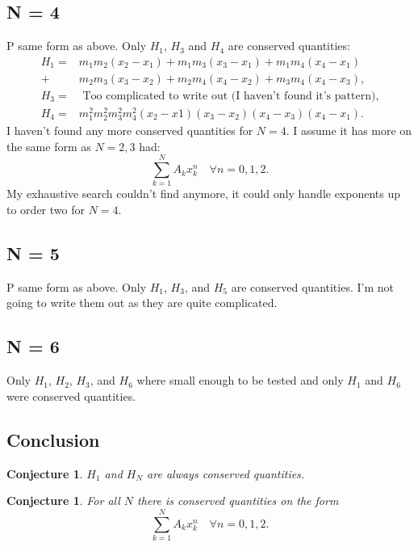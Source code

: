 \documentclass[english,master]{liumaiex}
\theoremstyle{plain}
\newtheorem{conjecture}[proposition]{Conjecture}
\theoremstyle{definition}
\begin{document}
\subsection{N = 4}

P same form as above. Only $H_1$, $H_3$ and $H_4$ are conserved quantities:
\begin{align}
	H_1 = &m_1 m_2 (x_2 - x_1) + m_1 m_3 (x_3 - x_1) + m_1 m_4 (x_4 - x_1) \\ +  &m_2 m_3 (x_3 - x_2) + m_2 m_4 (x_4 - x_2) + m_3 m_4 (x_4 - x_3), \\
	H_3 = &\text{ Too complicated to write out (I haven't found it's pattern)}, \\
	H_4 = &m_1^2m_2^2m_3^2m_4^2(x_2 - x1)(x_3 - x_2)(x_4 - x_3)(x_4 - x_1).
\end{align}
%
I haven't found any more conserved quantities for $N = 4$. I assume it has more on the same form as $N = 2, 3$ had:
\begin{equation}
	\sum_{k=1}^{N} A_k x_k^n \quad \forall n = 0, 1, 2.
\end{equation}
My exhaustive search couldn't find anymore, it could only handle exponents up to order two for $N = 4$.

\subsection{N = 5}

P same form as above. Only $H_1$, $H_3$, and $H_5$ are conserved quantities. I'm not going to write them out as they are quite complicated.

\subsection{N = 6}

Only $H_1$, $H_2$, $H_3$, and $H_6$ where small enough to be tested and only $H_1$ and $H_6$ were conserved quantities.

\subsection{Conclusion}

\begin{conjecture}
$H_1$ and $H_N$ are always conserved quantities.
\end{conjecture}

\begin{conjecture}
For all $N$ there is conserved quantities on the form
\begin{equation}
	\sum_{k=1}^{N} A_k x_k^n \quad \forall n = 0, 1, 2.
\end{equation}
\end{conjecture}
\end{document}
